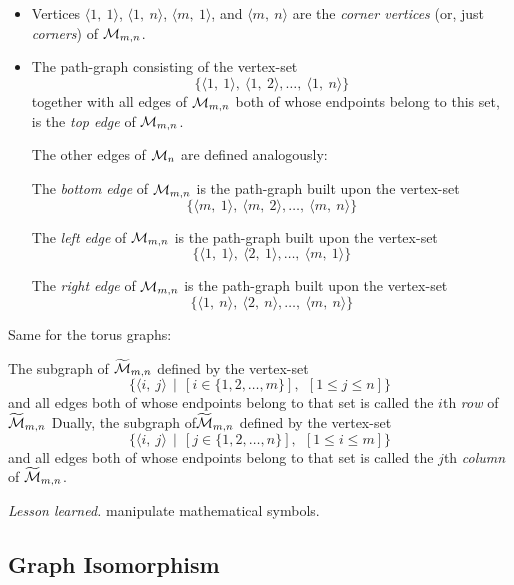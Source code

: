 \begin{itemize}
     \item
Vertices $\langle 1, \ 1 \rangle$, $\langle 1, \ n \rangle$, $\langle m,
\ 1 \rangle$, and $\langle m, \ n \rangle$ are the {\it corner vertices}
(or, just {\it corners}) of $\mbox{$\cal M$}_{m,n}$.
     \item
The path-graph consisting of the vertex-set
\[ \{ \langle 1, \ 1 \rangle, \ \langle 1, \ 2 \rangle, \ldots, \
\langle 1, \ n \rangle \}
\]
together with all edges of $\mbox{$\cal M$}_{m,n}$ both of whose endpoints belong
to this set, is the {\it top edge} of $\mbox{$\cal M$}_{m,n}$.

The other edges of $\mbox{$\cal M$}_n$ are defined analogously:

\medskip

The {\it bottom edge} of $\mbox{$\cal M$}_{m,n}$ is the path-graph built upon the
vertex-set
\[ \{ \langle m, \ 1 \rangle, \ \langle m, \ 2 \rangle, \ldots, \
\langle m, \ n \rangle \}
\]

The {\it left edge} of $\mbox{$\cal M$}_{m,n}$ is the path-graph built upon the
vertex-set
\[ \{ \langle 1, \ 1 \rangle, \ \langle 2, \ 1 \rangle, \ldots, \
\langle m, \ 1 \rangle \}
\]

The {\it right edge} of $\mbox{$\cal M$}_{m,n}$ is the path-graph built upon the
vertex-set
\[ \{ \langle 1, \ n \rangle, \ \langle 2, \ n \rangle, \ldots, \
\langle m, \ n \rangle \}
\]
\end{itemize}
\medskip

Same for the torus graphs:

The subgraph of $\widetilde{\mbox{$\cal M$}}_{m,n}$ defined by the vertex-set
\[ \{ \langle i, \ j \rangle  \ \ | \ \ \left[i \in \{1, 2, \ldots,
  m\}\right], \ \ \left[1 \leq j \leq n\right]\}
\]
and all edges both of whose endpoints belong to that set is called the
$i$th {\it row} of $\widetilde{\mbox{$\cal M$}}_{m,n}$
Dually, the subgraph of$\widetilde{\mbox{$\cal M$}}_{m,n}$ defined by the vertex-set
\[ \{ \langle i, \ j \rangle  \ \ | \ \ \left[j \in \{1, 2, \ldots,
  n\}\right], \ \ \left[1 \leq i \leq m\right] \}
\]
and all edges both of whose endpoints belong to that set is called the
$j$th {\it column} of $\widetilde{\mbox{$\cal M$}}_{m,n}$.
\medskip

\noindent \textit{Lesson learned.}
manipulate mathematical symbols. 




\subsection{Graph Isomorphism}
\label{Exercice:isomorphism}

